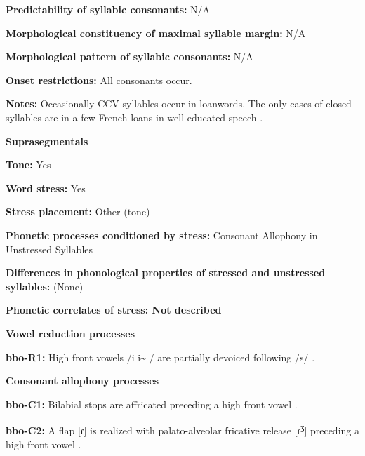 \textbf{Predictability of syllabic consonants:} N/A



\textbf{Morphological constituency of maximal syllable margin:} N/A



\textbf{Morphological pattern of syllabic consonants:} N/A



\textbf{Onset restrictions:} All consonants occur.



\textbf{Notes:} Occasionally CCV syllables occur in loanwords. The only cases of closed syllables are in a few French loans in well-educated speech \citep[113]{Morse1976}.



\textbf{Suprasegmentals}



\textbf{Tone:} Yes



\textbf{Word stress:} Yes



\textbf{Stress placement:} Other (tone)



\textbf{Phonetic processes conditioned by stress:} Consonant Allophony in Unstressed Syllables



\textbf{Differences in phonological properties of stressed and unstressed syllables:} (None)



\textbf{Phonetic correlates of stress: Not described}



\textbf{Vowel reduction processes}



\textbf{bbo-R1:} High front vowels /i i\~{} / are partially devoiced following /s/ \citep[28-9]{Morse1976}.



\textbf{Consonant allophony processes}



\textbf{bbo-C1:} Bilabial stops are affricated preceding a high front vowel \citep[20]{Morse1976}.



\textbf{bbo-C2:} A flap [ɾ] is realized with palato-alveolar fricative release [ɾ\textsuperscript{ʒ}] preceding a high front vowel \citep[25]{Morse1976}.



